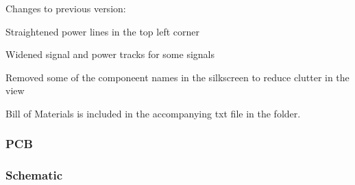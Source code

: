 Changes to previous version\+:


\begin{DoxyItemize}
\item Straightened power lines in the top left corner
\item Widened signal and power tracks for some signals
\item Removed some of the componeent names in the silkscreen to reduce clutter in the view
\end{DoxyItemize}

Bill of Materials is included in the accompanying txt file in the folder.

\subsubsection*{P\+CB}



\subsubsection*{Schematic}

 